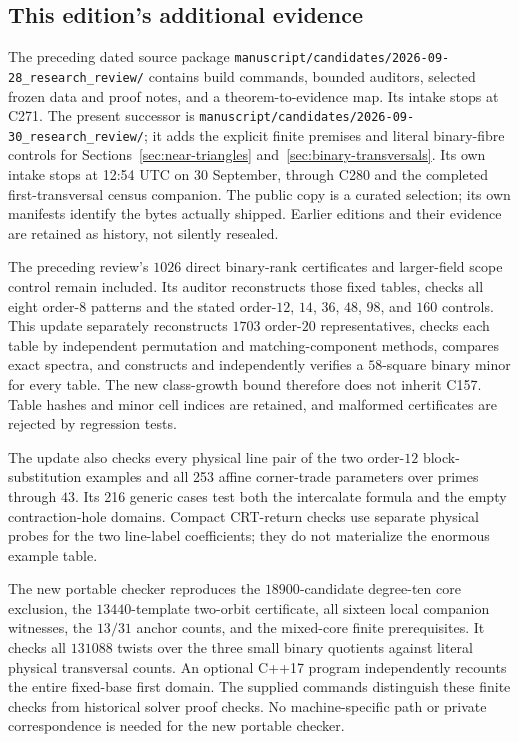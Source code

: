 \subsection*{This edition's additional evidence}

The preceding dated source package
\nolinkurl{manuscript/candidates/2026-09-28_research_review/}
contains build commands, bounded auditors, selected frozen data and
proof notes, and a theorem-to-evidence map. Its intake stops at C271.
The present successor is
\nolinkurl{manuscript/candidates/2026-09-30_research_review/};
it adds the explicit finite premises and literal binary-fibre controls
for Sections~\ref{sec:near-triangles} and~\ref{sec:binary-transversals}.
Its own intake stops at 12:54 UTC on 30 September, through C280 and
the completed first-transversal census companion.
The public copy is a curated selection; its own manifests identify
the bytes actually shipped. Earlier editions and their evidence are
retained as history, not silently resealed.

The preceding review's $1026$ direct binary-rank certificates and
larger-field scope control remain included. Its auditor reconstructs
those fixed tables, checks all eight order-$8$ patterns and the
stated order-$12$, $14$, $36$, $48$, $98$, and $160$ controls.
This update separately reconstructs $1703$ order-$20$ representatives,
checks each table by independent permutation and matching-component
methods, compares exact spectra, and constructs and independently
verifies a $58$-square binary minor for every table. The new class-growth
bound therefore does not inherit C157. Table hashes and minor cell
indices are retained, and malformed certificates are rejected by
regression tests.

The update also checks every physical line pair of the two order-$12$
block-substitution examples and all 253 affine corner-trade parameters
over primes through $43$. Its 216 generic cases test both the
intercalate formula and the empty contraction-hole domains. Compact
CRT-return checks use separate physical probes for the two line-label
coefficients; they do not materialize the enormous example table.

The new portable checker reproduces the $18900$-candidate degree-ten
core exclusion, the $13440$-template two-orbit certificate, all sixteen
local companion witnesses, the $13/31$ anchor counts, and the mixed-core
finite prerequisites. It checks all $131088$ twists over the three small
binary quotients against literal physical transversal counts. An optional
C++17 program independently recounts the entire fixed-base first domain.
The supplied commands distinguish these finite checks from historical
solver proof checks. No machine-specific path or private correspondence
is needed for the new portable checker.

